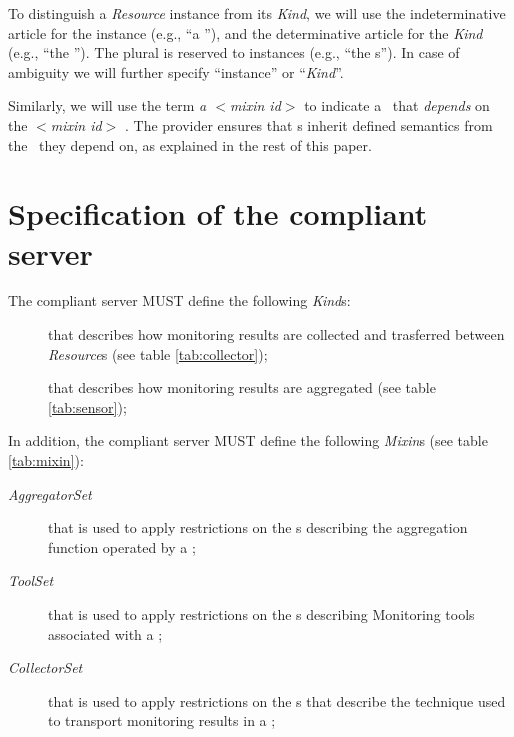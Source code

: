 \documentclass[12pt]{article}  %
\begin{document}
To distinguish a {\em Resource} instance from its {\em Kind}, we will use the indeterminative article for the instance (e.g., ``a \rs''), and the determinative article for the {\em Kind} (e.g., ``the \rs''). The plural is reserved to instances (e.g., ``the \rs s''). In case of ambiguity we will further specify ``instance'' or ``{\em Kind}''. 

Similarly, we will use the term {\em a $<$mixin id$>$ \mi} to indicate a \mi\ that {\em depends} on the {\em $<$mixin id$>$} \mi. The provider ensures that \mi s inherit defined semantics from the \mi\ they depend on, as explained in the rest of this paper. 

\section{Specification of the compliant server}

The compliant server MUST define the following {\em Kind}s:

\begin{description}

\item [\coll] that describes how monitoring results are collected and trasferred between {\em Resource}s (see table \ref{tab:collector});

\item [\sens] that describes how monitoring results are aggregated (see table  \ref{tab:sensor});

\end{description}

In addition, the compliant server MUST define the following {\em Mixin}s (see table \ref{tab:mixin}): 

\begin{description}

\item [{\em AggregatorSet}] that is used to apply restrictions on the \mi s describing the aggregation function operated by a \sens;

\item [{\em ToolSet}] that is used to apply restrictions on the \mi s describing Monitoring tools associated with a \coll;

\item [{\em CollectorSet}] that is used to apply restrictions on the \mi s that describe the technique used to transport monitoring results in a \coll;

\end{description}
\end{document}
